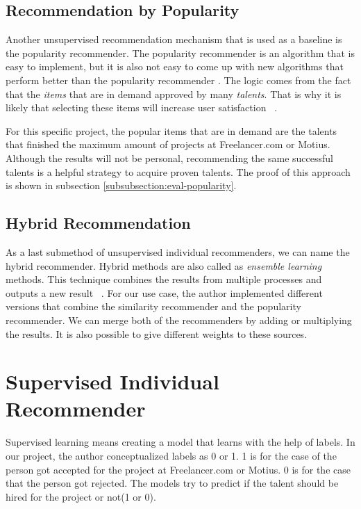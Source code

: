 \subsection{Recommendation by Popularity}


Another unsupervised recommendation mechanism that is used as a baseline is the popularity recommender. The popularity recommender is an algorithm that is easy to implement, but it is also not easy to come up with new algorithms that perform better than the popularity recommender \cite{amatriain2015recommender}. The logic comes from the fact that the \textit{items} that are in demand approved by many \textit{talents}. That is why it is likely that selecting these items will increase user satisfaction ~\parencite{amatriain2015recommender}. 


For this specific project, the popular items that are in demand are the talents that finished the maximum amount of projects at Freelancer.com or Motius. Although the results will not be personal, recommending the same successful talents is a helpful strategy to acquire proven talents. The proof of this approach is shown in subsection \ref{subsubsection:eval-popularity}.


\subsection{Hybrid Recommendation}\label{section:hybrid}

As a last submethod of unsupervised individual recommenders, we can name the hybrid recommender. Hybrid methods are also called as \textit{ensemble learning} methods. This technique combines the results from multiple processes and outputs a new result ~\parencite{beliakov2015aggregation}. For our use case, the author implemented different versions that combine the similarity recommender and the popularity recommender. We can merge both of the recommenders by adding or multiplying the results. It is also possible to give different weights to these sources.


\section{Supervised Individual Recommender}\label{section:supervised}

Supervised learning means creating a model that learns with the help of labels. In our project, the author conceptualized labels as 0 or 1. 1 is for the case of the person got accepted for the project at Freelancer.com or Motius. 0 is for the case that the person got rejected. The models try to predict if the talent should be hired for the project or not(1 or 0).



